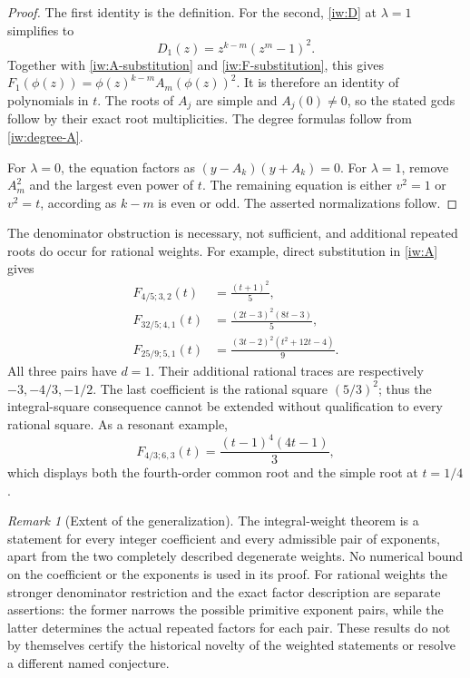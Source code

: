 \documentclass[11pt,a4paper]{article}
\theoremstyle{definition}
\theoremstyle{remark}
\newtheorem{remark}[theorem]{Remark}
\begin{document}
\begin{proof}
The first identity is the definition. For the second,
\eqref{iw:D} at \(\lambda=1\) simplifies to
\[
 D_1(z)=z^{k-m}(z^m-1)^2.
 \tag{\(\triangle\)}
\]
Together with \eqref{iw:A-substitution} and
\eqref{iw:F-substitution}, this gives
\(F_1(\phi(z))=\phi(z)^{k-m}A_m(\phi(z))^2\).
It is therefore an identity of polynomials in \(t\).
The roots of \(A_j\) are simple and \(A_j(0)\ne0\), so
the stated gcds follow by their exact root multiplicities.
The degree formulas follow from \eqref{iw:degree-A}.

For \(\lambda=0\), the equation factors as
\((y-A_k)(y+A_k)=0\).
For \(\lambda=1\), remove \(A_m^2\) and the largest even
power of \(t\). The remaining equation is either \(v^2=1\)
or \(v^2=t\), according as \(k-m\) is even or odd.
The asserted normalizations follow.
\end{proof}

The denominator obstruction is necessary, not sufficient,
and additional repeated roots do occur for rational weights.
For example, direct substitution in \eqref{iw:A} gives
\begin{align}
 F_{4/5;3,2}(t)&=\frac{(t+1)^2}{5},\label{iw:example-one}\\
 F_{32/5;4,1}(t)&=\frac{(2t-3)^2(8t-3)}5,\label{iw:example-two}\\
 F_{25/9;5,1}(t)&=
   \frac{(3t-2)^2(t^2+12t-4)}9.\label{iw:example-three}
\end{align}
All three pairs have \(d=1\). Their additional rational traces
are respectively \(-3,-4/3,-1/2\).
The last coefficient is the rational square \((5/3)^2\);
thus the integral-square consequence cannot be extended
without qualification to every rational square.
As a resonant example,
\[
 F_{4/3;6,3}(t)=\frac{(t-1)^4(4t-1)}3,
\]
which displays both the fourth-order common root and the
simple root at \(t=1/4\).

\begin{remark}[Extent of the generalization]\label{iw:scope}
The integral-weight theorem is a statement for every
integer coefficient and every admissible pair of exponents,
apart from the two completely described degenerate weights.
No numerical bound on the coefficient or the exponents is
used in its proof. For rational weights the stronger
denominator restriction and the exact factor description
are separate assertions: the former narrows the possible
primitive exponent pairs, while the latter determines the
actual repeated factors for each pair. These results do not
by themselves certify the historical novelty of the
weighted statements or resolve a different named conjecture.
\end{remark}
\end{document}
